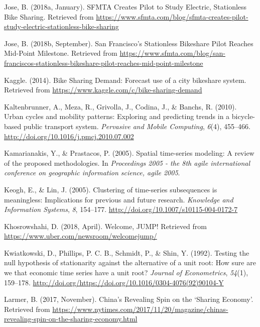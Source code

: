 \documentclass[12pt,oneside]{reedthesis}
\begin{document}
\hypertarget{ref-sfmta2018one}{}
Jose, B. (2018a, January). SFMTA Creates Pilot to Study Electric,
Stationless Bike Sharing. Retrieved from
\url{https://www.sfmta.com/blog/sfmta-creates-pilot-study-electric-stationless-bike-sharing}

\hypertarget{ref-sfmta2018two}{}
Jose, B. (2018b, September). San Francisco's Stationless Bikeshare Pilot
Reaches Mid-Point Milestone. Retrieved from
\url{https://www.sfmta.com/blog/san-franciscos-stationless-bikeshare-pilot-reaches-mid-point-milestone}

\hypertarget{ref-kaggle}{}
Kaggle. (2014). Bike Sharing Demand: Forecast use of a city bikeshare
system. Retrieved from
\url{https://www.kaggle.com/c/bike-sharing-demand}

\hypertarget{ref-kaltenbrunner2010}{}
Kaltenbrunner, A., Meza, R., Grivolla, J., Codina, J., \& Banchs, R.
(2010). Urban cycles and mobility patterns: Exploring and predicting
trends in a bicycle-based public transport system. \emph{Pervasive and
Mobile Computing}, \emph{6}(4), 455--466.
\url{http://doi.org/10.1016/j.pmcj.2010.07.002}

\hypertarget{ref-kamarianakis2005}{}
Kamarianakis, Y., \& Prastacos, P. (2005). Spatial time-series modeling:
A review of the proposed methodologies. In \emph{Proceedings 2005 - the
8th agile international conference on geographic information science,
agile 2005}.

\hypertarget{ref-keogh2005}{}
Keogh, E., \& Lin, J. (2005). Clustering of time-series subsequences is
meaningless: Implications for previous and future research.
\emph{Knowledge and Information Systems}, \emph{8}, 154--177.
\url{http://doi.org/10.1007/s10115-004-0172-7}

\hypertarget{ref-uber2018}{}
Khosrowshahi, D. (2018, April). Welcome, JUMP! Retrieved from
\url{https://www.uber.com/newsroom/welcomejump/}

\hypertarget{ref-kwiat1992}{}
Kwiatkowski, D., Phillips, P. C. B., Schmidt, P., \& Shin, Y. (1992).
Testing the null hypothesis of stationarity against the alternative of a
unit root: How sure are we that economic time series have a unit root?
\emph{Journal of Econometrics}, \emph{54}(1), 159--178.
\url{http://doi.org/https://doi.org/10.1016/0304-4076(92)90104-Y}

\hypertarget{ref-nytimes}{}
Larmer, B. (2017, November). China's Revealing Spin on the `Sharing
Economy'. Retrieved from
\url{https://www.nytimes.com/2017/11/20/magazine/chinas-revealing-spin-on-the-sharing-economy.html}
\end{document}
